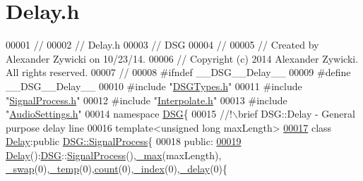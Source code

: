 \hypertarget{_delay_8h_source}{\section{Delay.\+h}
\label{_delay_8h_source}
}

\begin{DoxyCode}
00001 \textcolor{comment}{//}
00002 \textcolor{comment}{//  Delay.h}
00003 \textcolor{comment}{//  DSG}
00004 \textcolor{comment}{//}
00005 \textcolor{comment}{//  Created by Alexander Zywicki on 10/23/14.}
00006 \textcolor{comment}{//  Copyright (c) 2014 Alexander Zywicki. All rights reserved.}
00007 \textcolor{comment}{//}
00008 \textcolor{preprocessor}{#ifndef \_\_DSG\_\_Delay\_\_}
00009 \textcolor{preprocessor}{#define \_\_DSG\_\_Delay\_\_}
00010 \textcolor{preprocessor}{#include "\hyperlink{_d_s_g_types_8h}{DSGTypes.h}"}
00011 \textcolor{preprocessor}{#include "\hyperlink{_signal_process_8h}{SignalProcess.h}"}
00012 \textcolor{preprocessor}{#include "\hyperlink{_interpolate_8h}{Interpolate.h}"}
00013 \textcolor{preprocessor}{#include "\hyperlink{_audio_settings_8h}{AudioSettings.h}"}
00014 \textcolor{keyword}{namespace }\hyperlink{namespace_d_s_g}{DSG}\{\textcolor{comment}{}
00015 \textcolor{comment}{    //!\(\backslash\)brief DSG::Delay - General purpose delay line}
00016 \textcolor{comment}{}    \textcolor{keyword}{template}<\textcolor{keywordtype}{unsigned} \textcolor{keywordtype}{long} maxLength>
\hypertarget{_delay_8h_source_l00017}{}\hyperlink{class_d_s_g_1_1_delay}{00017}     \textcolor{keyword}{class }\hyperlink{class_d_s_g_1_1_delay}{Delay}:\textcolor{keyword}{public} \hyperlink{class_d_s_g_1_1_signal_process}{DSG::SignalProcess}\{
00018     \textcolor{keyword}{public}:
\hypertarget{_delay_8h_source_l00019}{}\hyperlink{class_d_s_g_1_1_delay_a20fb108695dac24156aeb2143a88555a}{00019}         \hyperlink{class_d_s_g_1_1_delay_a20fb108695dac24156aeb2143a88555a}{Delay}():\hyperlink{namespace_d_s_g}{DSG}::\hyperlink{class_d_s_g_1_1_signal_process}{SignalProcess}(),\hyperlink{class_d_s_g_1_1_delay_a1751998677ff85f6580c383e17347d9c}{\_max}(maxLength),
      \hyperlink{class_d_s_g_1_1_delay_af026ee90120c5cea6a935aef6cab6624}{\_swap}(0),\hyperlink{class_d_s_g_1_1_delay_a039bb7a3a39aff5841b9e808cacc1a6e}{\_temp}(0),\hyperlink{class_d_s_g_1_1_delay_a1d54836950db9724434880d859d1e3ea}{count}(0),\hyperlink{class_d_s_g_1_1_delay_ac39e72226786a3c43b231b69752431ec}{\_index}(0),\hyperlink{class_d_s_g_1_1_delay_aad8790118689ae46c7f434b790358e3f}{\_delay}(0)\{

\end{DoxyCode}
